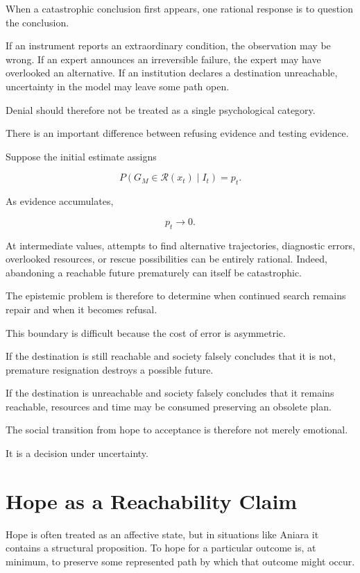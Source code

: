 \documentclass[11pt,oneside]{book}
\theoremstyle{definition}
\theoremstyle{remark}
\newcommand{\R}{\mathcal{R}}
\begin{document}
When a catastrophic conclusion first appears, one rational response is to question the conclusion.

If an instrument reports an extraordinary condition, the observation may be wrong. If an expert announces an irreversible failure, the expert may have overlooked an alternative. If an institution declares a destination unreachable, uncertainty in the model may leave some path open.

Denial should therefore not be treated as a single psychological category.

There is an important difference between refusing evidence and testing evidence.

Suppose the initial estimate assigns

\[
P(G_M\in\R(x_t)\mid I_t)=p_t.
\]

As evidence accumulates,

\[
p_t\rightarrow0.
\]

At intermediate values, attempts to find alternative trajectories, diagnostic errors, overlooked resources, or rescue possibilities can be entirely rational. Indeed, abandoning a reachable future prematurely can itself be catastrophic.

The epistemic problem is therefore to determine when continued search remains repair and when it becomes refusal.

This boundary is difficult because the cost of error is asymmetric.

If the destination is still reachable and society falsely concludes that it is not, premature resignation destroys a possible future.

If the destination is unreachable and society falsely concludes that it remains reachable, resources and time may be consumed preserving an obsolete plan.

The social transition from hope to acceptance is therefore not merely emotional.

It is a decision under uncertainty.

\section{Hope as a Reachability Claim}

Hope is often treated as an affective state, but in situations like Aniara it contains a structural proposition. To hope for a particular outcome is, at minimum, to preserve some represented path by which that outcome might occur.
\end{document}
